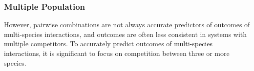 \documentclass{mcmthesis}
\begin{document}






\subsubsection*{Multiple Population}

However, pairwise combinations are not always accurate predictors of outcomes of multi-species interactions, and outcomes are often less consistent in systems with multiple competitors. To accurately predict outcomes of multi-species interactions, it is significant to focus on competition between three or more species.
\end{document}
